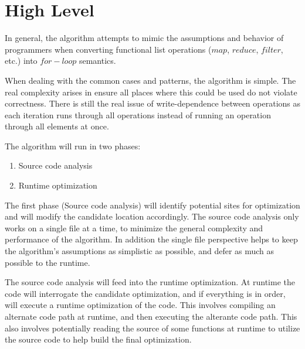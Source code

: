 \section{High Level}
In general, the algorithm attempts to mimic the assumptions and behavior of programmers when converting functional list operations ($map$, $reduce$, $filter$, etc.) into $for-loop$ semantics.

When dealing with the common cases and patterns, the algorithm is simple.  The real complexity arises in ensure all places where this could be used do not violate correctness.  There is still the real issue of write-dependence between operations as each iteration runs through all operations instead of running an operation through all elements at once.

The algorithm will run in two phases:
  \begin{enumerate}
    \item Source code analysis
    \item Runtime optimization
  \end{enumerate}

The first phase (Source code analysis) will identify potential sites for optimization and will modify the candidate location accordingly.  The source code analysis only works on a single file at a time, to minimize the general complexity and performance of the algorithm. In addition the single file perspective helps to keep the algorithm's assumptions as simplistic as possible, and defer as much as possible to the runtime.

The source code analysis will feed into the runtime optimization.  At runtime the code will interrogate the candidate optimization, and if everything is in order, will execute a runtime optimization of the code.  This involves compiling an alternate code path at runtime, and then executing the alterante code path.  This also involves potentially reading the source of some functions at runtime to utilize the source code to help build the final optimization.
